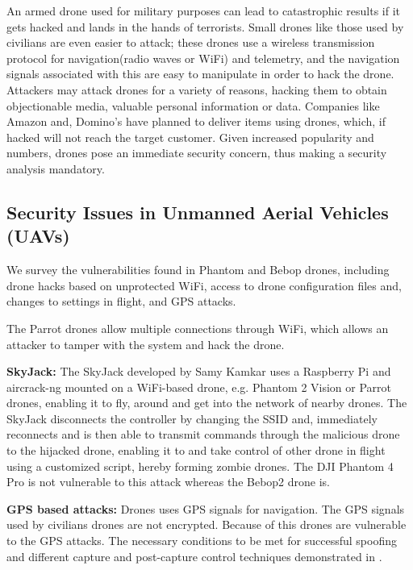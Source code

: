 \documentclass[conference]{IEEEtran}
\begin{document}
An armed drone used for military purposes can lead to catastrophic results if it gets hacked and lands in the hands of terrorists. Small drones like those used by civilians are even easier to attack; these drones use a wireless transmission protocol for navigation(radio waves or WiFi) and telemetry, and the navigation signals
associated with this are easy to manipulate in order to hack the drone. Attackers may attack drones for a variety of reasons, hacking them to obtain objectionable media, valuable personal information or data.
Companies like Amazon and, Domino’s have planned to deliver items using drones, which, if hacked will not reach the target customer. Given increased popularity and numbers, drones pose an immediate security concern, thus making a security analysis mandatory.

\subsection{Security Issues in Unmanned Aerial Vehicles (UAVs)}\label{Related Works}
We survey the vulnerabilities found in Phantom and Bebop drones, including drone hacks based on unprotected WiFi, access to drone configuration files and, changes to settings in flight, and GPS attacks. 
 
 The Parrot drones allow multiple connections through WiFi, which allows an attacker to tamper with the system and hack the drone. 

\noindent \textbf{SkyJack: }
The SkyJack \cite{skyjack} developed by Samy Kamkar uses a Raspberry Pi and aircrack-ng \cite{aircrack} mounted on a WiFi-based drone, e.g. Phantom 2 Vision or Parrot drones, enabling it to fly, around and get into the network of nearby drones. The SkyJack disconnects the controller by changing the SSID and, immediately reconnects and is then able to transmit commands through the malicious drone to the hijacked drone, enabling it to and take control of other drone in flight using a customized script, hereby forming zombie drones. The DJI Phantom 4 Pro is not vulnerable to this attack whereas the Bebop2 drone is. 

\noindent \textbf{GPS based attacks:}
Drones uses GPS signals for navigation. The GPS signals used by civilians drones are not encrypted. 
Because of this drones are vulnerable to the GPS attacks. The necessary conditions to be met for successful spoofing and different capture and post-capture control techniques demonstrated  in \cite{ROB:ROB21513}.
\end{document}
